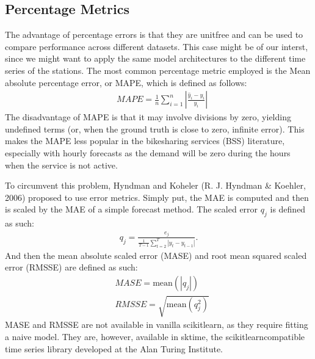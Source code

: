 \documentclass[letterpaper,10pt,english]{jupyterBook}
\begin{document}
\subsection{Percentage Metrics}
\label{\detokenize{06-forecasting:percentage-metrics}}
\sphinxAtStartPar
The advantage of percentage errors is that they are unit\sphinxhyphen{}free and can be used to compare performance across different datasets. This case might be of our interst, since we might want to apply the same model architectures to the different time series of the stations. The most common percentage metric employed is the Mean absolute percentage error, or MAPE, which is defined as follows:
\label{equation:06-forecasting:172ab603-4d81-43f3-a5c7-4c4a381b8be5}\begin{align}
&MAPE= \frac{1}{n}\sum_{i=1}^{n}\left\vert \frac{\hat{y}_{i}-y_{i}}{y_{i}}\right\vert
\end{align}
\sphinxAtStartPar
The disadvantage of MAPE is that it may involve divisions by zero, yielding undefined terms (or, when the ground truth is close to zero, infinite error). This makes the MAPE less popular in the bike\sphinxhyphen{}sharing services (BSS) literature, especially with hourly forecasts as the demand will be zero during the hours when the service is not active.

\sphinxAtStartPar
To circumvent this problem, Hyndman and Koheler (R. J. Hyndman \& Koehler, 2006) proposed to use  error metrics. Simply put, the MAE is computed and then is scaled by the  MAE of a simple forecast method. The scaled error \(q_j\) is defined as such:
\label{equation:06-forecasting:4b05855a-eaa7-44d1-90d1-706e70effb3f}\begin{align}
q_{j} = \frac{\displaystyle e_{j}}
    {\displaystyle\frac{1}{T-1}\sum_{t=2}^T |y_{t}-y_{t-1}|}.
\end{align}
\sphinxAtStartPar
And then the mean absolute scaled error (MASE) and root mean squared scaled error (RMSSE) are defined as such:
\label{equation:06-forecasting:586f505a-92c7-4eeb-b319-6b33070d2699}\begin{align}
& MASE = \text{mean}(|q_{j}|) \\
& RMSSE = \sqrt{\text{mean}(q_{j}^2)}
\end{align}
\sphinxAtStartPar
MASE and RMSSE are not available in vanilla scikit\sphinxhyphen{}learn, as they require fitting a naive model. They are, however, available in sktime, the scikit\sphinxhyphen{}learn\sphinxhyphen{}compatible time series library developed at the Alan Turing Institute.
\end{document}
